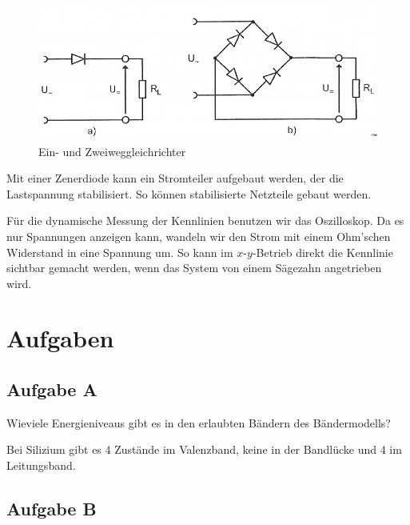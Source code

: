 \begin{figure}[htbp]
	\centering
	\includegraphics[width=.7\linewidth]{Bilder_aus_Anleitung/2-4.png}
	\caption{%
		Ein- und Zweiweggleichrichter \cite[Abbildung~2.4]{physik313-Anleitung}
	}
	\label{fig:2-4}
\end{figure}

Mit einer Zenerdiode kann ein Stromteiler aufgebaut werden, der die
Lastspannung stabilisiert. So können stabilisierte Netzteile gebaut werden.

Für die dynamische Messung der Kennlinien benutzen wir das Oszilloskop. Da es
nur Spannungen anzeigen kann, wandeln wir den Strom mit einem Ohm'schen
Widerstand in eine Spannung um. So kann im $x$-$y$-Betrieb direkt die Kennlinie
sichtbar gemacht werden, wenn das System von einem Sägezahn angetrieben wird.


\FloatBarrier
\section{Aufgaben}

\FloatBarrier
\subsection{Aufgabe A}

\begin{problem}
	Wieviele Energieniveaus gibt es in den erlaubten Bändern des Bändermodells?
\end{problem}

Bei Silizium gibt es 4 Zustände im Valenzband, keine in der Bandlücke und 4 im
Leitungsband. \cite[Vorlesung~16, Folie~13]{meschede/physik441}

\FloatBarrier
\subsection{Aufgabe B}

